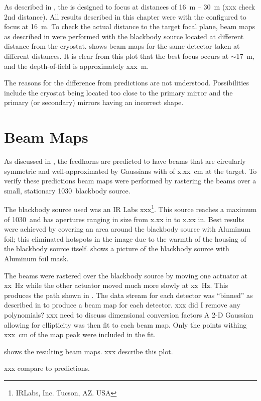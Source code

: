 As described in , the \Imager is designed to focus at distances of 16~m -- 30~m (xxx check 2nd distance).
All results described in this chapter were with the \Imager configured to focus at 16~m.
To check the actual distance to the target focal plane, beam maps as described in  were performed with the blackbody source located at different distance from the cryostat.
 shows beam maps for the same detector taken at different distances.
It is clear from this plot that the best focus occurs at $\sim$17~m, and the depth-of-field is approximately xxx~m.

The reasons for the difference from \ZEMAX predictions are not understood.
Possibilities include the cryostat being located too close to the primary mirror and the primary (or secondary) mirrors having an incorrect shape.

\section{Beam Maps}

As discussed in , the \Imager feedhorns are predicted to have beams that are circularly symmetric and well-approximated by Gaussians with \FWHM of x.xx~cm at the target.
To verify these predictions beam maps were performed by rastering the beams over a small, stationary 1030~\degC blackbody source.

The blackbody source used was an IR Labs xxx\footnote{IRLabs, Inc. Tucson, AZ. USA}.
This source reaches a maximum of 1030~\degC and has apertures ranging in size from x.xx in to x.xx in.
Best results were achieved by covering an area around the blackbody source with Aluminum foil; this eliminated hotspots in the image due to the warmth of the housing of the blackbody source itself.
 shows a picture of the blackbody source with Aluminum foil mask.

The \Imager beams were rastered over the blackbody source by moving one actuator at xx~Hz while the other actuator moved much more slowly at xx~Hz.
This produces the path shown in .
The data stream for each detector was ``binned'' as described in  to produce a beam map for each detector.
xxx did I remove any polynomials?
xxx need to discuss dimensional conversion factors
A 2-D Gaussian allowing for ellipticity was then fit to each beam map.
Only the points withing xxx~cm of the map peak were included in the fit.

 shows the resulting beam maps.
xxx describe this plot.

xxx compare to predictions.